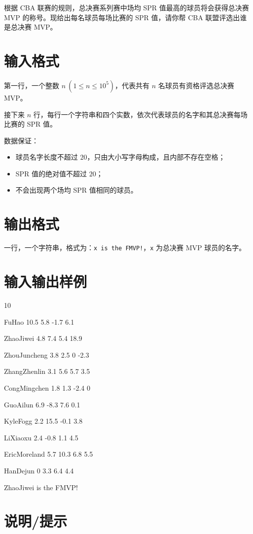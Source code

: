 \documentclass{ctpro}
\begin{document}
根据 CBA 联赛的规则，总决赛系列赛中场均 SPR 值最高的球员将会获得总决赛 MVP 的称号。现给出每名球员每场比赛的 SPR 值，请你帮 CBA 联盟评选出谁是总决赛 MVP。

\section*{输入格式}

第一行，一个整数 $n~(1 \leq n \leq {10}^5)$，代表共有 $n$ 名球员有资格评选总决赛 MVP。

接下来 $n$ 行，每行一个字符串和四个实数，依次代表球员的名字和其总决赛每场比赛的 SPR 值。

数据保证：

\begin{itemize}
    \item 球员名字长度不超过 $20$，只由大小写字母构成，且内部不存在空格；
    \item SPR 值的绝对值不超过 $20$；
    \item 不会出现两个场均 SPR 值相同的球员。
\end{itemize}

\section*{输出格式}

一行，一个字符串，格式为：\texttt{x is the FMVP!}，\texttt{x} 为总决赛 MVP 球员的名字。

\section*{输入输出样例}

\testcasetab
{
    10\par
    FuHao 10.5 5.8 -1.7 6.1\par
    ZhaoJiwei 4.8 7.4 5.4 18.9\par
    ZhouJuncheng 3.8 2.5 0 -2.3\par
    ZhangZhenlin 3.1 5.6 5.7 3.5\par
    CongMingchen 1.8 1.3 -2.4 0\par
    GuoAilun 6.9 -8.3 7.6 0.1\par
    KyleFogg 2.2 15.5 -0.1 3.8\par
    LiXiaoxu 2.4 -0.8 1.1 4.5\par
    EricMoreland 5.7 10.3 6.8 5.5\par
    HanDejun 0 3.3 6.4 4.4
}
{
    ZhaoJiwei is the FMVP!
}

\clearpage
\section*{说明/提示}
\end{document}

